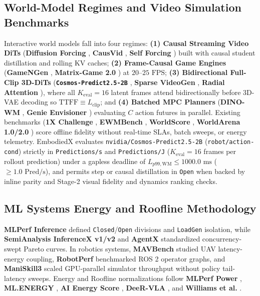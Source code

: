 \documentclass[10pt,letterpaper]{article}
\begin{document}
\subsection{World-Model Regimes and Video Simulation Benchmarks}
Interactive world models fall into four regimes: \textbf{(1) Causal Streaming Video DiTs} (\textbf{Diffusion Forcing} \cite{Chen2024diffusionforcing}, \textbf{CausVid} \cite{Yin2025causvid}, \textbf{Self Forcing} \cite{Huang2025selfforcing}) built with causal student distillation and rolling KV caches; \textbf{(2) Frame-Causal Game Engines} (\textbf{GameNGen} \cite{Valevski2024gamengen}, \textbf{Matrix-Game 2.0} \cite{He2025matrixgame2}) at $20\text{--}25\text{ FPS}$; \textbf{(3) Bidirectional Full-Clip 3D-DiTs} (\textbf{\texttt{Cosmos-Predict2.5-2B}} \cite{NVIDIA2025cosmos}, \textbf{Sparse VideoGen} \cite{Xi2025sparsevideogen}, \textbf{Radial Attention} \cite{Li2025radialattention}), where all $K_{\text{eval}} = 16$ latent frames attend bidirectionally before 3D-VAE decoding so $\text{TTFF} \equiv L_{\text{clip}}$; and \textbf{(4) Batched MPC Planners} (\textbf{DINO-WM} \cite{Zhou2024dinowm}, \textbf{Genie Envisioner} \cite{Liao2025genie}) evaluating $C$ action futures in parallel. Existing benchmarks (\textbf{1X Challenge} \cite{Mereu2025generative}, \textbf{EWMBench} \cite{Yue2025ewmbench}, \textbf{WorldScore} \cite{Duan2025worldscore}, \textbf{WorldArena 1.0/2.0} \cite{Shang2026worldarena,Shang2026worldarena2}) score offline fidelity without real-time SLAs, batch sweeps, or energy telemetry. EmbodiedX evaluates \texttt{nvidia/Cosmos-Predict2.5-2B} (\texttt{robot/action-cond}) strictly in \texttt{Predictions/s} and \texttt{Predictions/J} ($K_{\text{eval}} = 16$ frames per rollout prediction) under a gapless deadline of $L_{p99,\text{WM}} \le 1000.0\text{ ms}$ ($\ge 1.0\text{ Pred/s}$), and permits step or causal distillation in \texttt{Open} when backed by inline parity and Stage-2 visual fidelity and dynamics ranking checks.

\subsection{ML Systems Energy and Roofline Methodology}
\textbf{MLPerf Inference} \cite{Reddi2020mlperf} defined \texttt{Closed}/\texttt{Open} divisions and \texttt{LoadGen} isolation, while \textbf{SemiAnalysis InferenceX v1/v2} \cite{Patel2025inferencemax,Patel2026inferencexv2} and \textbf{AgentX} \cite{Patel2026agentx} standardized concurrency-swept Pareto curves. In robotics systems, \textbf{MAVBench} \cite{Boroujerdian2018mavbench} studied UAV latency-energy coupling, \textbf{RobotPerf} \cite{MayoralVilches2024robotperf} benchmarked ROS 2 operator graphs, and \textbf{ManiSkill3} \cite{Tao2024maniskill3} scaled GPU-parallel simulator throughput without policy tail-latency sweeps. Energy and Roofline normalizations follow \textbf{MLPerf Power} \cite{MLCommons2026power}, \textbf{ML.ENERGY} \cite{Chung2025mlenergy}, \textbf{AI Energy Score} \cite{Luccioni2025aienergy}, \textbf{DeeR-VLA} \cite{Yue2024deervla}, and \textbf{Williams et al.} \cite{Williams2009roofline}.
\end{document}
